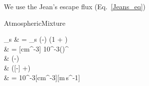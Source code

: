We use the Jean's escape flux (Eq.~\ref{Jeans_eq})
\begin{equationCode}{AtmosphericMixture}
\begin{split}
\Jeans_s &     = \conc_s 
                 \exp\left(-\right)
                 \left(1 + \right) \\
\uu [cm^{-3}\,km\,s^{-1}]   
         & \uu = [cm^{-3}] 10^{-3}\left(\frac{[\ukb] [K]}{[kg]}\right)^{} \\
         & \uu\fakeequalspace
                 \exp\left(-\right) \\
         & \uu\fakeequalspace
                 \left([-] +\right) \\
         & \uu = 10^{-3}[cm^{-3}][m\,s^{-1}]
\end{split}
\label{Jeans_eq}
\end{equationCode}
